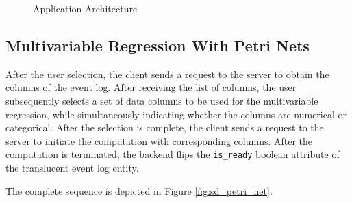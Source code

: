 \begin{figure}
    \caption{Application Architecture}
    \label{fig:app_architecture}
\end{figure}

\subsection{Multivariable Regression With Petri Nets}

After the user selection, the client sends a request to the server to obtain the columns of the event log. After receiving the list of columns, the user subsequently selects a set of data columns to be used for the multivariable regression, while simultaneously indicating whether the columns are numerical or categorical. After the selection is complete, the client sends a request to the server to initiate the computation with corresponding columns. After the computation is terminated, the backend flips the \texttt{is\_ready} boolean attribute of the translucent event log entity.

The complete sequence is depicted in Figure \ref*{fig:sd_petri_net}.

